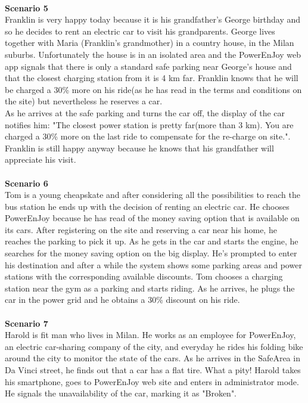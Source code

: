 \documentclass[11pt,a4paper]{report}
\begin{document}
\noindent \\
\textbf{Scenario 5}\\
Franklin is very happy today because it is his grandfather's George birthday and so he decides to rent an electric car to visit his grandparents. George lives together with Maria (Franklin's grandmother) in a country house, in the Milan suburbs. Unfortunately the house is in an isolated area and the PowerEnJoy web app signals that there is only a standard safe parking near George's house and that the closest charging station from it is 4 km far. Franklin knows that he will be charged a 30\% more on his ride(as he has read in the terms and conditions on the site) but nevertheless he reserves a car.\\
As he arrives at the safe parking and turns the car off, the display of the car notifies him: "The closest power station is pretty far(more than 3 km). You are charged a 30\% more on the last ride to compensate for the re-charge on site.". Franklin is still happy anyway because he knows that his grandfather will appreciate his visit.\\ 
\noindent \\
\textbf{Scenario 6}\\
Tom is a young cheapskate and after considering all the possibilities to reach the bus station he ends up with the decision of renting an electric car. He chooses PowerEnJoy because he has read of the money saving option that is available on its cars. After registering on the site and reserving a car near his home, he reaches the parking to pick it up. As he gets in the car and starts the engine, he searches for the money saving option on the big display. He's prompted to enter his destination and after a while the system shows some parking areas and power stations with the corresponding available discounts. Tom chooses a charging station near the gym as a parking and starts riding. As he arrives, he plugs the car in the power grid and he obtains a 30\% discount on his ride.\\
\noindent \\
\textbf{Scenario 7}\\ 
Harold is fit man who lives in Milan. He works as an employee for PowerEnJoy, an electric car-sharing company of the city, and everyday he rides his folding bike around the city to monitor the state of the cars. As he arrives in the SafeArea in Da Vinci street, he finds out  that a car has a flat tire. What a pity! Harold takes his smartphone, goes to PowerEnJoy web site and enters in administrator mode. He signals the unavailability of the car, marking it as "Broken".\\
\end{document}
